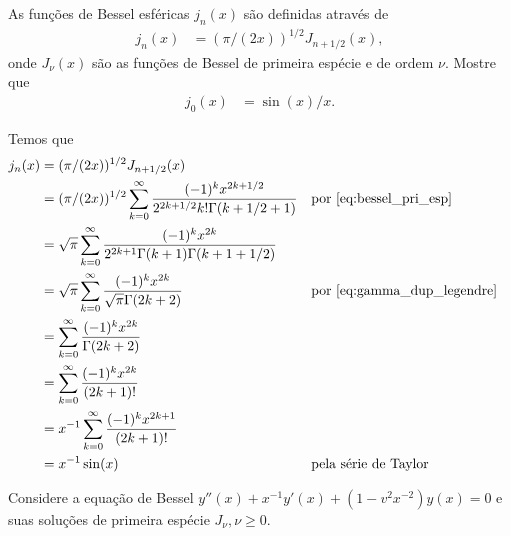 \documentclass[a4paper,12pt, leqno, answers]{exam}
\begin{document}
\begin{questions}

    \question[P3 de 2006] As fun\c{c}\~{o}es de Bessel esf\'{e}ricas $j_n(x)$ s\~{a}o definidas atrav\'{e}s de
    \begin{align*}
        j_n(x) &= (\pi / (2x) )^{1/2} J_{n + 1/2}(x),
    \end{align*}
    onde $J_\nu(x)$ s\~{a}o as fun\c{c}\~{o}es de Bessel de primeira esp\'{e}cie e de ordem $\nu$. Mostre que
    \begin{align*}
        j_0(x) &= \sin(x) / x.
    \end{align*}
    \begin{solution}
        Temos que
        \begin{align*}
            j_n(x) &= (\pi / (2x) )^{1/2} J_{n + 1/2}(x) \\
            &= (\pi / (2x) )^{1/2} \sum_{k = 0}^\infty \frac{(-1)^k x^{2k + 1/2}}{2^{2k + 1/2} k! \Gamma(k + 1/2 + 1)} && \text{por \eqref{eq:bessel_pri_esp}} \\
            &= \sqrt{\pi} \sum_{k = 0}^\infty \frac{(-1)^k x^{2k}}{2^{2k + 1} \Gamma(k + 1) \Gamma(k + 1 + 1/2)} \\
            &= \sqrt{\pi} \sum_{k = 0}^\infty \frac{(-1)^k x^{2k}}{\sqrt{\pi} \Gamma(2k + 2)} && \text{por \eqref{eq:gamma_dup_legendre}} \\
            &= \sum_{k = 0}^\infty \frac{(-1)^k x^{2k}}{\Gamma(2k + 2)} \\
            &= \sum_{k = 0}^\infty \frac{(-1)^k x^{2k}}{(2k + 1)!} \\
            &= x^{-1} \sum_{k = 0}^\infty \frac{(-1)^k x^{2k + 1}}{(2k + 1)!} \\
            &= x^{-1} \sin(x) && \text{pela s\'{e}rie de Taylor}
        \end{align*}
    \end{solution}

    \question[P2 de 2010] Considere a equa\c{c}\~{a}o de Bessel $y''(x) + x^{-1} y'(x) + (1 - v^2 x^{-2}) y(x) = 0$ e suas solu\c{c}\~{o}es de primeira esp\'{e}cie $J_\nu, \nu \geq 0$.
    \begin{parts}

\end{parts}
\end{questions}
\end{document}
